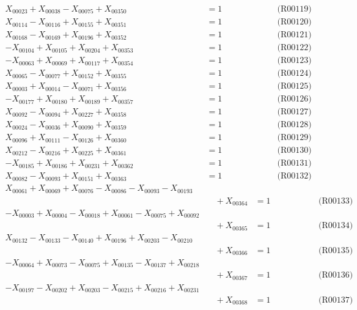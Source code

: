 \documentclass[a4paper,10pt]{article}
\begin{document}
{\begin{align}
X_{00023} + X_{00038} - X_{00075} + X_{00350} &= 1 && \text{(R00119)} \\
X_{00114} - X_{00116} + X_{00155} + X_{00351} &= 1 && \text{(R00120)} \\
\allowbreak
X_{00168} - X_{00169} + X_{00196} + X_{00352} &= 1 && \text{(R00121)} \\
-X_{00104} + X_{00105} + X_{00204} + X_{00353} &= 1 && \text{(R00122)} \\
-X_{00063} + X_{00069} + X_{00117} + X_{00354} &= 1 && \text{(R00123)} \\
X_{00065} - X_{00077} + X_{00152} + X_{00355} &= 1 && \text{(R00124)} \\
X_{00003} + X_{00014} - X_{00071} + X_{00356} &= 1 && \text{(R00125)} \\
-X_{00177} + X_{00180} + X_{00189} + X_{00357} &= 1 && \text{(R00126)} \\
X_{00092} - X_{00094} + X_{00227} + X_{00358} &= 1 && \text{(R00127)} \\
X_{00024} - X_{00036} + X_{00090} + X_{00359} &= 1 && \text{(R00128)} \\
X_{00096} + X_{00111} - X_{00126} + X_{00360} &= 1 && \text{(R00129)} \\
X_{00212} - X_{00216} + X_{00225} + X_{00361} &= 1 && \text{(R00130)} \\
-X_{00185} + X_{00186} + X_{00231} + X_{00362} &= 1 && \text{(R00131)} \\
X_{00082} - X_{00093} + X_{00151} + X_{00363} &= 1 && \text{(R00132)} \\
X_{00061} + X_{00069} + X_{00076} - X_{00086} - X_{00093} - X_{00193} \\[0.5ex]
&\quad  + X_{00364} &= 1 && \text{(R00133)} \\
-X_{00003} + X_{00004} - X_{00018} + X_{00061} - X_{00075} + X_{00092} \\[0.5ex]
&\quad  + X_{00365} &= 1 && \text{(R00134)} \\
X_{00132} - X_{00133} - X_{00140} + X_{00196} + X_{00203} - X_{00210} \\[0.5ex]
&\quad  + X_{00366} &= 1 && \text{(R00135)} \\
-X_{00064} + X_{00073} - X_{00075} + X_{00135} - X_{00137} + X_{00218} \\[0.5ex]
&\quad  + X_{00367} &= 1 && \text{(R00136)} \\
-X_{00197} - X_{00202} + X_{00203} - X_{00215} + X_{00216} + X_{00231} \\[0.5ex]
&\quad  + X_{00368} &= 1 && \text{(R00137)} \\

\end{align}}
\end{document}
